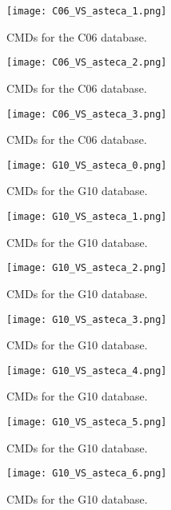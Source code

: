 \documentclass{aa}
\begin{document}
\begin{appendix}
\begin{figure*}
\texttt{[image: C06\_VS\_asteca\_1.png]}
\caption{CMDs for the C06 database.}
\label{fig:DBs_C06_1}
\end{figure*}
\clearpage

\begin{figure*}
\texttt{[image: C06\_VS\_asteca\_2.png]}
\caption{CMDs for the C06 database.}
\label{fig:DBs_C06_2}
\end{figure*}
\clearpage

\begin{figure}
\texttt{[image: C06\_VS\_asteca\_3.png]}
\caption{CMDs for the C06 database.}
\label{fig:DBs_C06_3}
\end{figure}
\clearpage

\begin{figure*}
\texttt{[image: G10\_VS\_asteca\_0.png]}
\caption{CMDs for the G10 database.}
\label{fig:DBs_G10_0}
\end{figure*}
\clearpage

\begin{figure*}
\texttt{[image: G10\_VS\_asteca\_1.png]}
\caption{CMDs for the G10 database.}
\label{fig:DBs_G10_1}
\end{figure*}
\clearpage

\begin{figure*}
\texttt{[image: G10\_VS\_asteca\_2.png]}
\caption{CMDs for the G10 database.}
\label{fig:DBs_G10_2}
\end{figure*}
\clearpage

\begin{figure*}
\texttt{[image: G10\_VS\_asteca\_3.png]}
\caption{CMDs for the G10 database.}
\label{fig:DBs_G10_3}
\end{figure*}
\clearpage

\begin{figure*}
\texttt{[image: G10\_VS\_asteca\_4.png]}
\caption{CMDs for the G10 database.}
\label{fig:DBs_G10_4}
\end{figure*}
\clearpage

\begin{figure*}
\texttt{[image: G10\_VS\_asteca\_5.png]}
\caption{CMDs for the G10 database.}
\label{fig:DBs_G10_5}
\end{figure*}
\clearpage

\begin{figure*}
\texttt{[image: G10\_VS\_asteca\_6.png]}
\caption{CMDs for the G10 database.}
\label{fig:DBs_G10_6}
\end{figure*}
\clearpage


\end{appendix}
\end{document}
